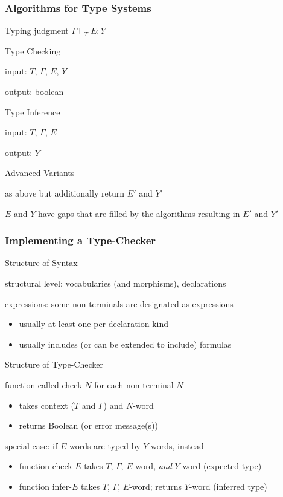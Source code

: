 \begin{frame}\frametitle{Algorithms for Type Systems}
Typing judgment $\Gamma\vdash_T E: Y$
\begin{blockitems}{Type Checking}
\item input: $T$, $\Gamma$, $E$, $Y$
\item output: boolean
\end{blockitems}

\begin{blockitems}{Type Inference}
\item input: $T$, $\Gamma$, $E$
\item output: $Y$
\end{blockitems}


\begin{blockitems}{Advanced Variants}
\item as above but additionally return $E'$ and $Y'$
\item $E$ and $Y$ have gaps that are filled by the algorithms resulting in $E'$ and $Y'$
\end{blockitems}
\end{frame}

\begin{frame}\frametitle{Implementing a Type-Checker}
\begin{blockitems}{Structure of Syntax}
\item structural level: vocabularies (and morphisms), declarations
\item expressions: some non-terminals are designated as expressions
 \begin{itemize}
 \item usually at least one per declaration kind
 \item usually includes (or can be extended to include) formulas
 \end{itemize}
\end{blockitems}

\begin{blockitems}{Structure of Type-Checker}
\item function called check-$N$ for each non-terminal $N$
 \begin{itemize}
 \item takes context ($T$ and $\Gamma$) and $N$-word
 \item returns Boolean (or error message(s))
 \end{itemize}
\item special case: if $E$-words are typed by $Y$-words, instead
 \begin{itemize}
 \item function check-$E$ takes $T$, $\Gamma$, $E$-word, \emph{and} $Y$-word (expected type)
 \item function infer-$E$ takes $T$, $\Gamma$, $E$-word; returns $Y$-word (inferred type)
 \end{itemize}
\end{blockitems}
\end{frame}

